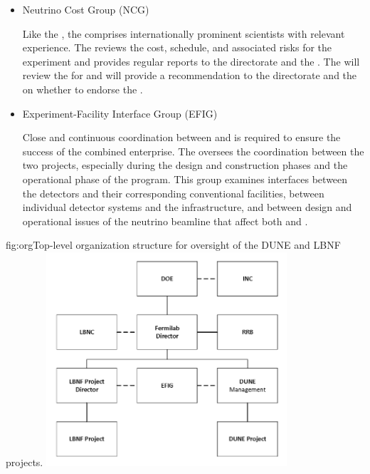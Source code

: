 \begin{itemize}
\item Neutrino Cost Group (NCG)

Like the , the  comprises internationally prominent scientists with relevant experience.  The  reviews the cost, schedule, and associated risks for the  experiment and provides regular reports to the  directorate and the .  The  will review the  for  and will provide a recommendation to the  directorate and the  on whether to endorse the .


\item Experiment-Facility Interface Group (EFIG)

Close and continuous coordination between  and  is required to ensure the success of the combined enterprise. The   oversees the coordination between the two projects, especially during the design and construction phases and the operational phase of the program.   
This group examines interfaces between the detectors and their corresponding conventional facilities, between individual detector systems and the  infrastructure, and between design and operational issues of the  neutrino beamline that affect both  and .  

\end{itemize}

\begin{dunefigure}	
{fig:org}{Top-level organization structure for oversight of the DUNE and LBNF projects.}
\includegraphics[width=0.67\textwidth]{graphics/lbnf_dune_org.png}  
\end{dunefigure}

